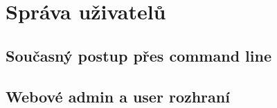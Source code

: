 \chapter{Správa uživatelů}
\label{4-praxe}

\section{Současný postup přes command line}

\section{Webové admin a user rozhraní}
